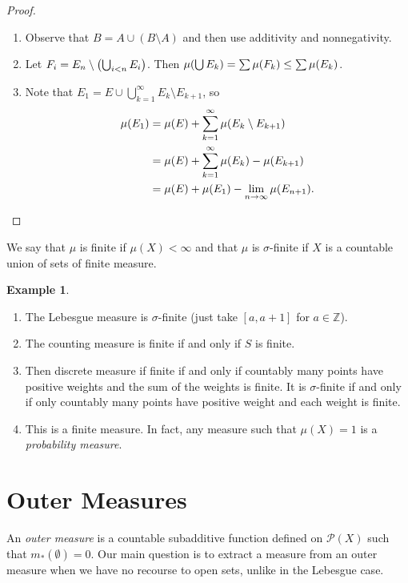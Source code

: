 \documentclass[leqno, openany]{memoir}
\theoremstyle{definition}
\newtheorem{exm}[thm]{Example}
\theoremstyle{remark}
\theoremstyle{plain}
\theoremstyle{definition}
\theoremstyle{remark}
\newcommand{\Z}{\mathbb{Z}}
\newcommand{\mc}[1]{\mathcal{#1}}
\begin{document}
\begin{proof} \begin{enumerate} \item Observe that $B = A \cup (B \setminus A)$
    and then use additivity and nonnegativity.  \item Let $F_i = E_n \setminus
    \qty(\bigcup_{i<n} E_i)$. Then $\mu\qty(\bigcup E_k) = \sum \mu(F_k) \leq
    \sum \mu(E_k)$.  \item Note that $E_1 = E \cup \bigcup_{k=1}^{\infty} E_k
    \setminus E_{k+1}$, so \begin{align*} \mu(E_1) &= \mu(E) +
        \sum_{k=1}^{\infty} \mu(E_k \setminus E_{k+1}) \\ &= \mu(E) +
        \sum_{k=1}^{\infty} \mu(E_k) - \mu(E_{k+1}) \\ &= \mu(E) + \mu(E_1) -
\lim_{n \to \infty} \mu(E_{n+1}). \qedhere \end{align*} \end{enumerate}
    \end{proof}

We say that $\mu$ is finite if $\mu(X) < \infty$ and that $\mu$ is
$\sigma$-finite if $X$ is a countable union of sets of finite measure.

\begin{exm} \begin{enumerate} \item The Lebesgue measure is $\sigma$-finite
    (just take $[a,a+1]$ for $a \in \Z$).  \item The counting measure is finite
    if and only if $S$ is finite.  \item Then discrete measure if finite if and
    only if countably many points have positive weights and the sum of the
    weights is finite. It is $\sigma$-finite if and only if only countably many
    points have positive weight and each weight is finite.  \item This is a
    finite measure. In fact, any measure such that $\mu(X) = 1$ is a
    \textit{probability measure}.  \end{enumerate} \end{exm}

\section{Outer Measures}%

An \textit{outer measure} is a countable subadditive function defined on
$\mc{P}(X)$ such that $m_*(\emptyset) = 0$. Our main question is to extract a
measure from an outer measure when we have no recourse to open sets, unlike in
the Lebesgue case.
\end{document}
